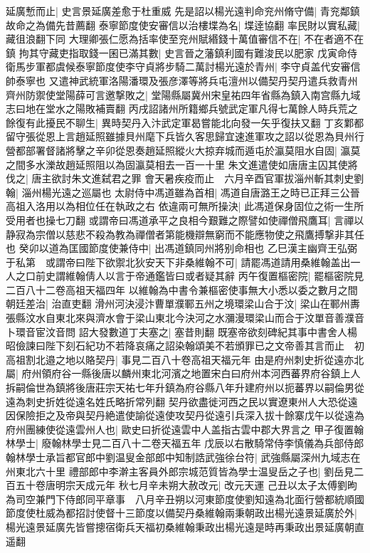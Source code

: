 延廣慙而止|{
	史言景延廣差愈于杜重威}
先是詔以楊光遠判命兖州脩守備|{
	青兖鄰鎮故命之為備先昔薦翻}
泰寧節度使安審信以治樓堞為名|{
	堞逹協翻}
率民財以實私藏|{
	藏徂浪翻下同}
大理卿張仁愿為括率使至兖州賦緡錢十萬值審信不在|{
	不在者適不在鎮}
拘其守藏吏指取錢一囷已滿其數|{
	史言晉之藩鎮利國有難浚民以肥家}
戊寅命侍衛馬步軍都虞候泰寧節度使李守貞將步騎二萬討楊光遠於青州|{
	李守貞盖代安審信帥泰寧也}
又遣神武統軍洛陽潘環及張彦澤等將兵屯澶州以備契丹契丹遣兵救青州齊州防禦使堂陽薛可言邀撃敗之|{
	堂陽縣屬冀州宋皇祐四年省縣為鎮入南宫縣九域志曰地在堂水之陽敗補賣翻}
丙戌詔諸州所籍鄉兵號武定軍凡得七萬餘人時兵荒之餘復有此擾民不聊生|{
	異時契丹入汴武定軍曷嘗能北向發一矢乎復扶又翻}
丁亥鄴都留守張從恩上言趙延照雖據貝州麾下兵皆久客思歸宜速進軍攻之詔以從恩為貝州行營都部署督諸將擊之辛卯從恩奏趙延照縱火大掠弃城而遁屯於瀛莫阻水自固|{
	瀛莫之間多水濼故趙延照阻以為固瀛莫相去一百一十里}
朱文進遣使如唐唐主囚其使將伐之|{
	唐主欲討朱文進弑君之罪}
會天暑疾疫而止　六月辛酉官軍拔淄州斬其刺史劉翰|{
	淄州楊光遠之巡屬也}
太尉侍中馮道雖為首相|{
	馮道自唐潞王之時已正拜三公晉高祖入洛用以為相位任在執政之右}
依違兩可無所操決|{
	此馮道保身固位之術一生所受用者也操七刀翻}
或謂帝曰馮道承平之良相今艱難之際譬如使禪僧飛鷹耳|{
	言禪以静寂為宗僧以慈悲不殺為教為禪僧者第能機辯無窮而不能應物使之飛鷹搏撃非其任也}
癸卯以道為匡國節度使兼侍中|{
	出馮道鎮同州將别命相也}
乙巳漢主幽齊王弘弼于私第　或謂帝曰陛下欲禦北狄安天下非桑維翰不可|{
	請罷馮道請用桑維翰盖出一人之口前史謂維翰倩人以言于帝通鑑皆曰或者疑其辭}
丙午復置樞密院|{
	罷樞密院見二百八十二卷高祖天福四年}
以維翰為中書令兼樞密使事無大小悉以委之數月之間朝廷差治|{
	治直吏翻}
滑州河決浸汴曹單濮鄆五州之境環梁山合于汶|{
	梁山在鄆州夀張縣汶水自東北來與濟水會于梁山東北今決河之水瀰漫環梁山而合于汶單音善濮音卜環音宦汶音問}
詔大發數道丁夫塞之|{
	塞昔則翻}
既塞帝欲刻碑紀其事中書舍人楊昭儉諫曰陛下刻石紀功不若降哀痛之詔染翰頌美不若頒罪已之文帝善其言而止　初高祖割北邉之地以賂契丹|{
	事見二百八十卷高祖天福元年}
由是府州刺史折從遠亦北屬|{
	府州領府谷一縣後唐以麟州東北河濱之地置宋白曰府州本河西蕃界府谷鎮上人拆嗣倫世為鎮將後唐莊宗天祐七年升鎮為府谷縣八年升建府州以扼蕃界以嗣倫男從遠為刺史折姓從遠名姓氏略折常列翻}
契丹欲盡徙河西之民以實遼東州人大恐從遠因保險拒之及帝與契丹絶遣使諭從遠使攻契丹從遠引兵深入拔十餘寨戊午以從遠為府州團練使從遠雲州人也|{
	歐史曰折從遠雲中人盖指古雲中郡大界言之}
甲子復置翰林學士|{
	廢翰林學士見二百八十二卷天福五年}
戊辰以右散騎常侍李慎儀為兵部侍郎翰林學士承旨都官郎中劉温叟金部郎中知制誥武強徐台符|{
	武強縣屬深州九域志在州東北六十里}
禮部郎中李澣主客員外郎宗城范質皆為學士温叟岳之子也|{
	劉岳見二百五十卷唐明宗天成元年}
秋七月辛未朔大赦改元|{
	改元天運}
己丑以太子太傅劉昫為司空兼門下侍郎同平章事　八月辛丑朔以河東節度使劉知遠為北面行營都統順國節度使杜威為都招討使督十三節度以備契丹桑維翰兩秉朝政出楊光遠景延廣於外|{
	楊光遠景延廣先皆嘗摠宿衛兵天福初桑維翰秉政出楊光遠是時再秉政出景延廣朝直遥翻}
